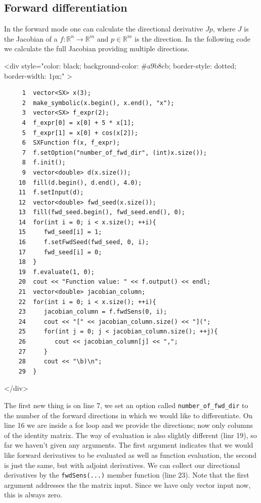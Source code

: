 \documentclass[a4paper,12pt]{book}
\newcommand{\codebegin}{
\begin{rawhtml}
<div style="color: black; background-color: \#a9b8cb;  border-style: dotted; border-width: 1px;" >
\end{rawhtml}
}
\newcommand{\codeend}{
\begin{rawhtml}
</div>
\end{rawhtml}
}
\newcommand{\codebegin}{

}
\newcommand{\codeend}{

}
\begin{document}
{\subsection*{Forward differentiation}
 In the forward mode one can calculate the directional derivative
$J p$, where $J$ is the Jacobian of a $f: \mathbb{R}^n \rightarrow \mathbb{R}^m$ and $p \in \mathbb{R}^m$ is the direction.
In the following code we calculate the full Jacobian providing multiple directions.
\par
\codebegin
\begin{verbatim}
     1  vector<SX> x(3);
     2  make_symbolic(x.begin(), x.end(), "x");
     3  vector<SX> f_expr(2);
     4  f_expr[0] = x[0] + 5 * x[1];
     5  f_expr[1] = x[0] + cos(x[2]);
     6  SXFunction f(x, f_expr);
     7  f.setOption("number_of_fwd_dir", (int)x.size());
     8  f.init();
     9  vector<double> d(x.size());
    10  fill(d.begin(), d.end(), 4.0);
    11  f.setInput(d);
    12  vector<double> fwd_seed(x.size());
    13  fill(fwd_seed.begin(), fwd_seed.end(), 0);
    14  for(int i = 0; i < x.size(); ++i){
    15     fwd_seed[i] = 1;
    16     f.setFwdSeed(fwd_seed, 0, i);
    17     fwd_seed[i] = 0;
    18  }
    19  f.evaluate(1, 0);
    20  cout << "Function value: " << f.output() << endl;
    21  vector<double> jacobian_column;
    22  for(int i = 0; i < x.size(); ++i){
    23     jacobian_column = f.fwdSens(0, i);
    24     cout << "[" << jacobian_column.size() << "](";
    25     for(int j = 0; j < jacobian_column.size(); ++j){
    26        cout << jacobian_column[j] << ",";
    27     }
    28     cout << "\b)\n";
    29  }
\end{verbatim}
\codeend
The first new thing is on line 7, we set an option called \texttt{number\_of\_fwd\_dir} to the number
of the forward directions in which we would like to differentiate. On line 16 we are inside a for loop
and we provide the directions; now only columns of the identity matrix. The way of evaluation is also
slightly different (linr 19), so far we haven't given any arguments. The first argument indicates that we would like
forward derivatives to be evaluated as well as function evaluation, the second is just the same,
 but with adjoint derivatives. We can collect our
directional derivatives by the \texttt{fwdSens(...)} member function (line 23). Note that the first argument addresses
the the matrix input. Since we have only vector input now, this is always zero.
}
\end{document}
